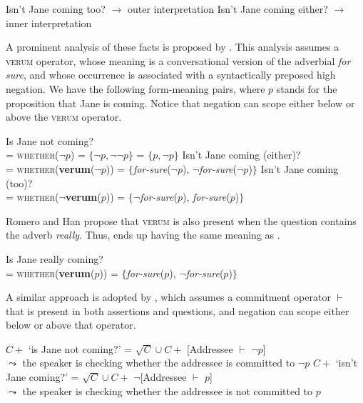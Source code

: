 \documentclass[output=paper,colorlinks,citecolor=brown]{langscibook}
\begin{document}
\begin{exe}\label{tooeither}
\ex\label{too}
Isn't Jane coming too? \hfill $\rightarrow$ outer interpretation
\ex\label{either}
Isn't Jane coming either? \hfill $\rightarrow$ inner interpretation
\end{exe}

A prominent analysis of these facts is proposed by \citet{romerohan2004negative}. %
This analysis assumes a \textsc{verum} operator, whose meaning is a conversational version of the adverbial \textit{for sure}, and whose occurrence is associated with a syntactically preposed high negation. We have the following form-meaning pairs, where $p$ stands for the proposition that Jane is coming. Notice that negation can scope either below or above the \textsc{verum} operator.

\begin{exe}\label{hanromero}
\ex\label{hanromerolowneg}
Is Jane not coming? \\= \textsc{whether}($\neg p$) = $\{\neg p, \neg\neg p\}$ = $\{p, \neg p\}$
\ex\label{hanromerohighnegeither}
Isn't Jane coming (either)? \\ = \textsc{whether}(\textbf{verum}($\neg p$)) = $\{$\textit{for-sure}($\neg p$),  $\neg$\textit{for-sure}($\neg p$)$\}$
\ex\label{hanromerohighnegtoo}
Isn't Jane coming (too)? \\ = \textsc{whether}($\neg$\textbf{verum}($p$)) = $\{$$\neg$\textit{for-sure}($p$), \textit{for-sure}($p$)$\}$
\end{exe}

Romero and Han propose that \textsc{verum} is also present when the question contains the adverb \textit{really}. Thus,  ends up having the same meaning as .

\ea\label{hanromeroreally}
Is Jane really coming?\\
= \textsc{whether}(\textbf{verum}($p$)) = $\{$\textit{for-sure}($p$), $\neg$\textit{for-sure}($p$)$\}$
\z

A similar approach is adopted by \citet{krifka2015bias}, which assumes a commitment operator $\vdash$ that is present in both assertions and questions, and negation can scope either below or above that operator.

\begin{exe}\label{krifkacommitmentoperator}
\ex
$C +$ `is Jane not coming?' = $\sqrt{C} \cup C +$ [Addressee $\vdash$ $\neg p$]\\
$\leadsto$ the speaker is checking whether the addressee is committed to $\neg p$
\ex
$C +$ `isn't Jane coming?' = $\sqrt{C} \cup C +$ $\neg$[Addressee $\vdash$ $p$]\\
$\leadsto$ the speaker is checking whether the addressee is not committed to $p$
\end{exe}
\end{document}
